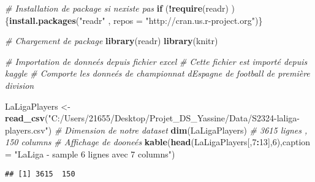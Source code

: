 \documentclass[
  6pt,
]{article}
\newenvironment{Shaded}{\begin{snugshade}}{\end{snugshade}}
\newcommand{\AttributeTok}[1]{\textcolor[rgb]{0.13,0.29,0.53}{#1}}
\newcommand{\CommentTok}[1]{\textcolor[rgb]{0.56,0.35,0.01}{\textit{#1}}}
\newcommand{\ControlFlowTok}[1]{\textcolor[rgb]{0.13,0.29,0.53}{\textbf{#1}}}
\newcommand{\DecValTok}[1]{\textcolor[rgb]{0.00,0.00,0.81}{#1}}
\newcommand{\FunctionTok}[1]{\textcolor[rgb]{0.13,0.29,0.53}{\textbf{#1}}}
\newcommand{\NormalTok}[1]{#1}
\newcommand{\OtherTok}[1]{\textcolor[rgb]{0.56,0.35,0.01}{#1}}
\newcommand{\SpecialCharTok}[1]{\textcolor[rgb]{0.81,0.36,0.00}{\textbf{#1}}}
\newcommand{\StringTok}[1]{\textcolor[rgb]{0.31,0.60,0.02}{#1}}
\begin{document}
\begin{Shaded}
\begin{Highlighting}[]
\CommentTok{\# Installation de package si n\textquotesingle{}existe pas }
\ControlFlowTok{if}\NormalTok{ (}\SpecialCharTok{!}\FunctionTok{require}\NormalTok{(readr) ) \{}\FunctionTok{install.packages}\NormalTok{(}\StringTok{"readr"}\NormalTok{ , }\AttributeTok{repos =} \StringTok{"http://cran.us.r{-}project.org"}\NormalTok{)\}}

\CommentTok{\# Chargement de package }
\FunctionTok{library}\NormalTok{(readr)}
\FunctionTok{library}\NormalTok{(knitr)}


\CommentTok{\# Importation de donneés depuis fichier excel }
\CommentTok{\# Cette fichier est importé depuis kaggle}
\CommentTok{\# Comporte les donneés de championnat d\textquotesingle{}Espagne de football de première division}

\NormalTok{LaLigaPlayers }\OtherTok{\textless{}{-}} \FunctionTok{read\_csv}\NormalTok{(}\StringTok{"C:/Users/21655/Desktop/Projet\_DS\_Yassine/Data/S2324{-}laliga{-}players.csv"}\NormalTok{)}
\CommentTok{\# Dimension de notre dataset }
\FunctionTok{dim}\NormalTok{(LaLigaPlayers) }\CommentTok{\# 3615 lignes , 150 columns }
\CommentTok{\# Affichage de dooneés }
\FunctionTok{kable}\NormalTok{(}\FunctionTok{head}\NormalTok{(LaLigaPlayers[,}\DecValTok{7}\SpecialCharTok{:}\DecValTok{13}\NormalTok{],}\DecValTok{6}\NormalTok{),}\AttributeTok{caption =} \StringTok{"LaLiga {-} sample 6 lignes avec 7 columns"}\NormalTok{)}
\end{Highlighting}
\end{Shaded}

\begin{verbatim}
## [1] 3615  150
\end{verbatim}
\end{document}

